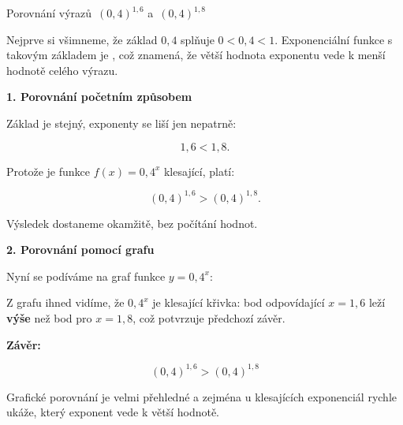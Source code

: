 \documentclass[12pt,a4paper]{article}
\begin{document}
\begin{examplebox}{Porovnání výrazů $\,(0{,}4)^{1{,}6}$ a $\,(0{,}4)^{1{,}8}$}

Nejprve si všimneme, že základ $0{,}4$ splňuje $0 < 0{,}4 < 1$.
Exponenciální funkce s takovým základem je ,
což znamená, že větší hodnota exponentu vede k menší hodnotě celého výrazu.

\medskip
\textbf{1. Porovnání početním způsobem}

Základ je stejný, exponenty se liší jen nepatrně:

\[
1{,}6 < 1{,}8.
\]

Protože je funkce $f(x)=0{,}4^{x}$ klesající, platí:

\[
(0{,}4)^{1{,}6} > (0{,}4)^{1{,}8}.
\]

Výsledek dostaneme okamžitě, bez počítání hodnot.

\medskip
\textbf{2. Porovnání pomocí grafu}

Nyní se podíváme na graf funkce $y = 0{,}4^{x}$:

\begin{center}
\end{center}


Z grafu ihned vidíme, že $0{,}4^{x}$ je klesající křivka:
bod odpovídající $x=1{,}6$ leží \textbf{výše} než bod pro $x=1{,}8$,
což potvrzuje předchozí závěr.

\medskip

\textbf{Závěr:}

\[
(0{,}4)^{1{,}6} > (0{,}4)^{1{,}8}
\]

Grafické porovnání je velmi přehledné a zejména u klesajících exponenciál rychle ukáže,
který exponent vede k větší hodnotě.
\end{examplebox}
\end{document}
